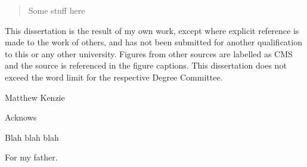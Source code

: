 
\begin{abstract}%
  Some stuff here
\end{abstract}


\begin{declaration}
  This dissertation is the result of my own work, except where explicit
  reference is made to the work of others, and has not been submitted
  for another qualification to this or any other university. Figures from other
  sources are labelled as CMS and the source is referenced in the figure captions.
  This dissertation does not exceed the word limit for the respective Degree
  Committee.
  \vspace*{1cm}
  \begin{flushright}
    Matthew Kenzie
  \end{flushright}
\end{declaration}


\begin{acknowledgements}
  Acknows
\end{acknowledgements}


\begin{preface}
  Blah blah blah
\end{preface}

\tableofcontents

\frontquote%
  {For my father.}%
  {}
